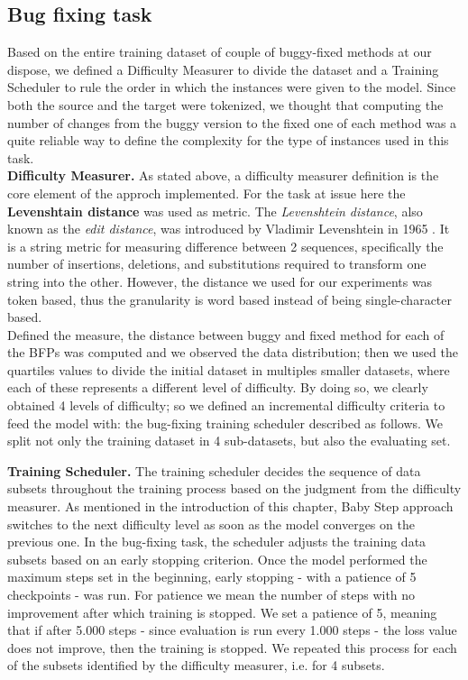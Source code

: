 \subsection{Bug fixing task}
Based on the entire training dataset of couple of buggy-fixed methods at our dispose, we defined a Difficulty Measurer to divide the dataset
and a Training Scheduler to rule the order in which the instances were given to the model. Since both the source and the target
were tokenized, we thought that computing the number of changes from the buggy version to the fixed one of each method was a quite reliable
way to define the complexity for the type of instances used in this task.\\
\newline
\textbf{Difficulty Measurer.} As stated above, a difficulty measurer definition is the core element of the approch implemented.
For the task at issue here the \textbf{Levenshtain distance} was used as metric. The \textit{Levenshtein distance}, also known as the \textit{edit distance}, 
was introduced by Vladimir Levenshtein in 1965 \cite{Levenshtein_SPD66}. It is a string metric for measuring difference between 2 sequences, specifically the number of insertions, deletions, and substitutions
required to transform one string into the other. However, the distance we used for our experiments was token based, thus the granularity is word based instead of being single-character based.\\
Defined the measure, the distance between buggy and fixed method for each of the BFPs was computed and we observed the data distribution; then we used the quartiles values to divide the initial dataset in multiples
smaller datasets, where each of these represents a different level of difficulty.
By doing so, we clearly obtained 4 levels of difficulty; so we defined an incremental difficulty criteria to feed the model with: 
the bug-fixing training scheduler described as follows. We split not only the training dataset in 4 sub-datasets, but 
also the evaluating set.\newline


\noindent\textbf{Training Scheduler.} The training scheduler decides the sequence of data subsets throughout the training process based
on the judgment from the difficulty measurer. As mentioned in the introduction of this chapter, Baby Step approach switches to the next difficulty level
as soon as the model converges on the previous one.
In the bug-fixing task, the scheduler adjusts
the training data subsets based on an early stopping criterion. Once the model performed the maximum 
steps set in the beginning, early stopping - with a patience of 5 checkpoints - was run. For 
patience we mean the number of steps with no improvement after which training is stopped. We set 
a patience of 5, meaning that if after 5.000 steps - since evaluation is run every 1.000 steps - the loss value 
does not improve, then the training is stopped. We repeated this process for each of the subsets identified 
by the difficulty measurer, i.e. for 4 subsets.

